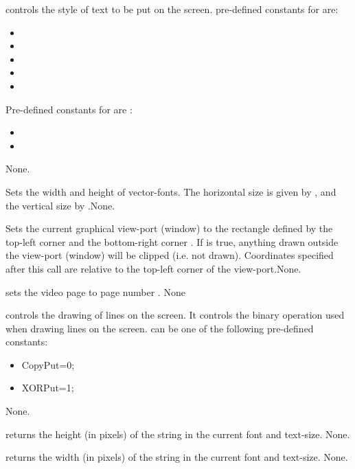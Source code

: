 { controls the style of text to be put on the screen.
pre-defined constants for  are:
\begin{itemize}
\item {}
\item {}
\item {}
\item {}
\item {}
\end{itemize}
Pre-defined constants for  are :
\begin{itemize}
\item {}
\item {}
\end{itemize}}{None.}{} 

{Sets the width and height of vector-fonts. The horizontal size is given
by , and the vertical size by .}{None.}
{}

{Sets the current graphical view-port (window) to the rectangle defined by
the top-left corner  and the bottom-right corner .
If  is true, anything drawn outside the view-port (window) will be
clipped (i.e. not drawn). Coordinates specified after this call are relative
to the top-left corner of the view-port.}{None.}{}

{ sets the video page to page number . }
{None}{}

{ controls the drawing of lines on the screen. It controls
the binary operation used when drawing lines on the screen.  can
be one of the following pre-defined constants:
\begin{itemize}
\item CopyPut=0;
\item XORPut=1;
\end{itemize}}{None.}{}

{ returns the height (in pixels) of the string  in
the current font and text-size.
}{None.}{}

{ returns the width (in pixels) of the string  in
the current font and text-size.
}{None.}{}
                                                                                                                                                                                                                                                                                                                                                                                                                                                                                                      
